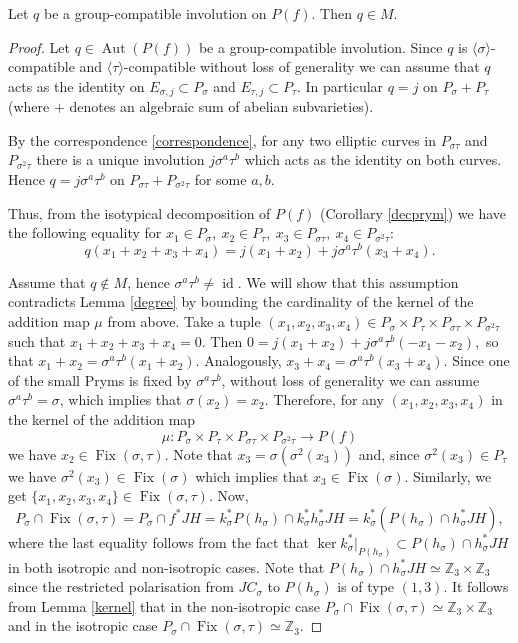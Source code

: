 \documentclass[10pt,a4paper]{amsart}
\DeclareMathOperator{\Aut}{Aut}
\DeclareMathOperator{\Fix}{Fix}
\DeclareMathOperator{\id}{id}
\newcommand{\s}{\sigma}
\begin{document}
\begin{prop}
\label{global}
    Let $q$ be a group-compatible involution on $P(f)$. Then $q \in M$.
\end{prop}

\begin{proof} 
    
    Let $q \in \Aut(P(f))$ be a group-compatible involution. 
    Since $q$ is $\langle \sigma \rangle$-compatible and $\langle \tau \rangle$-compatible without loss of generality we can assume  that $q$ acts as the identity on $E_{\sigma, j} \subset P_{\sigma}$ and $E_{\tau, j} \subset P_{\tau}$. In particular $q=j$ on $P_{\sigma}+P_{\tau}$ (where $+$ denotes an algebraic sum of abelian subvarieties).
    
           
   By the correspondence \ref{correspondence}, for any two elliptic curves in  $P_{\sigma\tau}$ and $P_{\sigma^2\tau}$ there is a unique involution $j\sigma^a\tau^b$ which acts as the identity on both curves. Hence $q=j\s^a\tau^b$ on $P_{\sigma\tau}+P_{\s^2\tau}$ for some $a,b$.
   
      Thus, from the isotypical decomposition of $P(f)$ (Corollary \ref{decprym}) we have the following equality for $x_1 \in P_{\sigma},\ x_2 \in P_{\tau},\ x_3 \in P_{\sigma\tau},\ x_4 \in P_{\sigma^2\tau}$: $$q(x_1 + x_2 + x_3 + x_4) = j(x_1 + x_2) + j\sigma^a\tau^b(x_3 + x_4).$$ 
      
      Assume that $q \notin M$, hence $\sigma^a\tau^b \neq \id$. We will show that this assumption contradicts Lemma \ref{degree} by bounding the cardinality of the kernel of the addition map $\mu$ from above. Take a tuple $(x_1, x_2, x_3, x_4) \in P_{\sigma} \times P_{\tau} \times P_{\sigma\tau}\times P_{\sigma^2\tau}$ such that $x_1 + x_2 + x_3 + x_4 = 0$. Then $0 = j(x_1 + x_2) + j\sigma^a\tau^b(-x_1 - x_2),$ so that $x_1 + x_2 = \sigma^a\tau^b(x_1 + x_2)$. Analogously, $x_3 + x_4 = \sigma^a\tau^b(x_3 + x_4)$.
    Since one of the small Pryms is fixed by $\sigma^a\tau^b$, without loss of generality   we can assume $\sigma^a\tau^b = \sigma$, which implies that $\sigma(x_2) = x_2$.
    Therefore, for any $(x_1, x_2, x_3, x_4)$ in the kernel of the addition map $$\mu: P_{\sigma} \times P_{\tau} \times P_{\sigma\tau}\times P_{\sigma^2\tau} \to P(f)$$ we have $x_2 \in \Fix(\sigma, \tau)$.  Note that $x_3 = \sigma(\sigma^2(x_3))$ and, since $\sigma^2(x_3) \in P_{\tau}$ we have $\sigma^2(x_3) \in \Fix(\s)$ which implies that $x_3 \in \Fix(\sigma)$. Similarly, we get $\{x_1, x_2, x_3, x_4\} \in \Fix(\sigma, \tau)$. Now, $$P_{\sigma} \cap \Fix(\sigma, \tau) = P_{\sigma} \cap f^*JH = k_{\sigma}^*P(h_{\sigma}) \cap k_{\s}^*h_{\s}^*JH = k_{\s}^*(P(h_\s) \cap h_{\s}^*JH),$$ where the last equality follows from the fact that $\ker k_{\sigma}^{*}|_{P(h_{\s})} \subset P(h_\s) \cap h_{\s}^*JH$ in both isotropic and non-isotropic cases. Note that $P(h_\s) \cap h_{\s}^*JH \simeq \mathbb{Z}_3 \times \mathbb{Z}_3$ since the restricted polarisation from $JC_{\sigma}$ to $P(h_{\sigma})$ is of type $(1,3)$. It follows from Lemma \ref{kernel} that in the non-isotropic case $P_{\sigma} \cap \Fix(\sigma, \tau) \simeq \mathbb{Z}_3 \times \mathbb{Z}_3$ and in the isotropic case $P_{\sigma} \cap \Fix(\sigma, \tau) \simeq \mathbb{Z}_3$. 
    

\end{proof}
\end{document}
